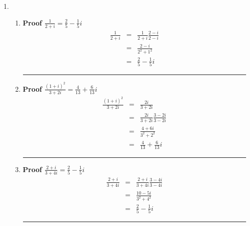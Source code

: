 \documentclass{article}%
\newcommand\abs[1]{\left|#1\right|}
\newenvironment{proof}[1][]{\begin{samepage}\textbf{Proof #1} }{\rule{0.5em}{0.5em} \end{samepage}}
\begin{document}
\begin{enumerate}
\begin{enumerate}[label*=\arabic*.]
\begin{enumerate}[label=\alph*]
\begin{proof}[$\abs{\frac{3+4i}{4+3i}}=1$]
\begin{eqnarray*}
                                           &=&\frac{\sqrt{3^2+4^2}}{\sqrt{4^2+3^2}} \\
                                           &=&1
                \end{eqnarray*}
            \end{proof}
        \end{enumerate}
        \item %
        \begin{enumerate}[label=\alph*]
            \item %
            \begin{proof}[$\frac{1}{2+i}=\frac{2}{5}-\frac{1}{5}i$]
                \begin{eqnarray*}
                    \frac{1}{2+i}&=&\frac{1}{2+i}\frac{2-i}{2-i} \\
                                 &=&\frac{2-i}{2^2+1^2} \\
                                 &=&\frac{2}{5}-\frac{1}{5}i
                \end{eqnarray*}
            \end{proof}
            \item %
            \begin{proof}[$\frac{(1+i)^2}{3+2i}=\frac{4}{13}+\frac{6}{13}i$]
                \begin{eqnarray*}
                    \frac{(1+i)^2}{3+2i}&=&\frac{2i}{3+2i} \\
                                        &=&\frac{2i}{3+2i} \frac{3-2i}{3-2i} \\
                                        &=&\frac{4+6i}{3^2+2^2} \\
                                        &=&\frac{4}{13}+\frac{6}{13}i
                \end{eqnarray*}
            \end{proof}
            \item %
            \begin{proof}[$\frac{2+i}{3+4i}=\frac{2}{5}-\frac{1}{5}i$]
                \begin{eqnarray*}
                    \frac{2+i}{3+4i}&=&\frac{2+i}{3+4i} \frac{3-4i}{3-4i} \\
                                    &=&\frac{10-5i}{3^2+4^2} \\
                                    &=&\frac{2}{5}-\frac{1}{5}i
                \end{eqnarray*}
            \end{proof}

\end{enumerate}
\end{enumerate}
\end{enumerate}
\end{document}
